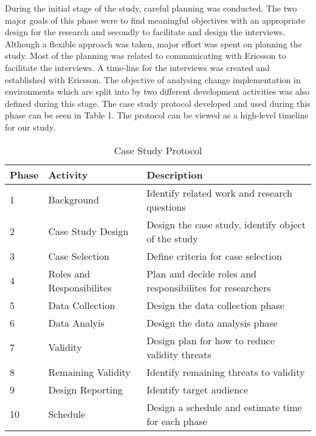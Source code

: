 \documentclass[10pt,twocolumn]{article}
\begin{document}
During the initial stage of the study, careful planning was conducted. The two major goals of this phase were to find meaningful objectives with an appropriate design for the research and secondly to facilitate and design the interviews. Although a flexible approach was taken, major effort was spent on planning the study. Most of the planning was related to communicating with Ericsson to facilitate the interviews. A time-line for the interviews was created and established with Ericsson. The objective of analysing change implementation in environments which are split into by two different development activities was also defined during this stage. The case study protocol \cite{brereton2008using} developed and used during this phase can be seen in Table 1. The protocol can be viewed as a high-level timeline for our study.

\begin{table}
	\centering
	\begin{tabular}[Ht]{|l|p{3cm}|p{3.5cm}|}
	\hline
	\textbf{Phase} & \textbf{Activity} & \textbf{Description} \\
	\hline
	1 & Background & Identify related work and research questions \\
	\hline
	2 & Case Study Design & Design the case study, identify object of the study \\
	\hline
	3 & Case Selection & Define criteria for case selection \\
	\hline
	4 & Roles and Responsibilites & Plan and decide roles and responsibilites for researchers \\
	\hline
	5 & Data Collection & Design the data collection phase \\
	\hline
	6 & Data Analyis & Design the data analysis phase \\
	\hline
	7 & Validity & Design plan for how to reduce validity threats \\
	\hline
	8 & Remaining Validity & Identify remaining threats to validity \\
	\hline
	9 & Design Reporting & Identify target audience \\
	\hline
	10 & Schedule & Design a schedule and estimate time for each phase \\
	\hline


	\hline
	\end{tabular}
	\caption{Case Study Protocol}
\end{table}
\end{document}
